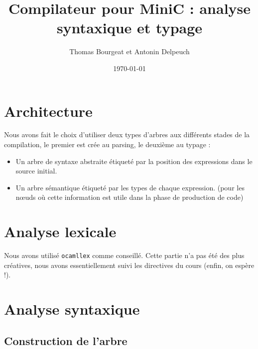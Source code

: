 \documentclass[a4paper]{article}
\begin{document}
\title{Compilateur pour MiniC : analyse syntaxique et typage}
\author{Thomas Bourgeat et Antonin Delpeuch}
\date{\today}

\maketitle

\section{Architecture}

Nous avons fait le choix d'utiliser deux types d'arbres aux différents
stades de la compilation, le premier est crée au parsing, le deuxième au
typage :
\begin{itemize}
    \item Un arbre de syntaxe abstraite étiqueté par la position des
expressions dans le source initial.
    \item Un arbre sémantique étiqueté par les types de chaque
expression.
(pour les nœuds où cette information est utile dans la phase de
production de code)
\end{itemize}

\section{Analyse lexicale}

Nous avons utilisé \texttt{ocamllex} comme conseillé.
Cette partie n'a pas été des plus créatives, nous avons essentiellement suivi les directives du cours (enfin, on espère !).

\section{Analyse syntaxique}

\subsection{Construction de l'arbre}
\end{document}
